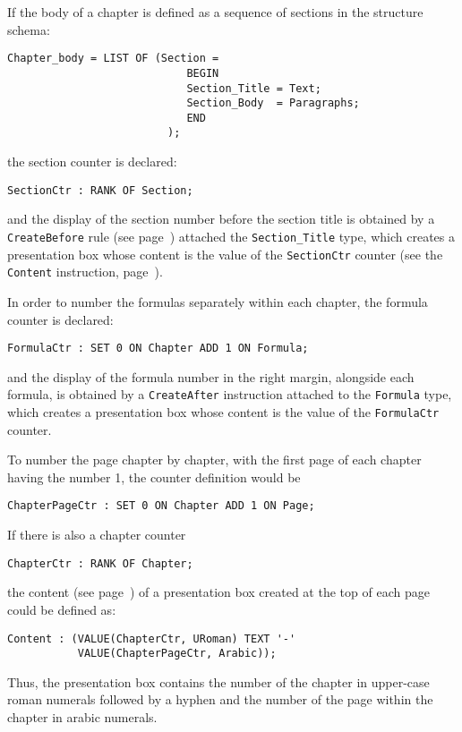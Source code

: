 \begin{example}
If the body of a chapter is defined as a sequence of sections in the
structure schema:

\begin{verbatim}
Chapter_body = LIST OF (Section = 
                            BEGIN
                            Section_Title = Text;
                            Section_Body  = Paragraphs;
                            END
                         );
\end{verbatim}
the section counter is declared:

\begin{verbatim}
SectionCtr : RANK OF Section;
\end{verbatim}
and the display of the section number before the section title is
obtained by a {\tt CreateBefore} rule (see page~\pageref{creation})
attached the {\tt Section\_Title} type, which creates a presentation
box whose content is the value of the {\tt SectionCtr} counter (see
the {\tt Content} instruction, page~\pageref{content}).

In order to number the formulas separately within each chapter, the
formula counter is declared:

\begin{verbatim}
FormulaCtr : SET 0 ON Chapter ADD 1 ON Formula;
\end{verbatim}
and the display of the formula number in the right margin, alongside
each formula, is obtained by a {\tt CreateAfter} instruction attached
to the {\tt Formula} type, which creates a presentation box whose
content is the value of the {\tt FormulaCtr} counter.

To number the page chapter by chapter, with the first page of each
chapter having the number 1, the counter definition would be
\begin{verbatim}
ChapterPageCtr : SET 0 ON Chapter ADD 1 ON Page;
\end{verbatim}
If there is also a chapter counter
\begin{verbatim}
ChapterCtr : RANK OF Chapter;
\end{verbatim}
the content (see page~\pageref{content}) of a presentation box created
at the top of each page could be defined as:
\begin{verbatim}
Content : (VALUE(ChapterCtr, URoman) TEXT '-'
           VALUE(ChapterPageCtr, Arabic));
\end{verbatim}
Thus, the presentation box contains the number of the chapter in
upper-case roman
numerals followed by a hyphen and the number of the page within the
chapter in arabic numerals.
\end{example}

